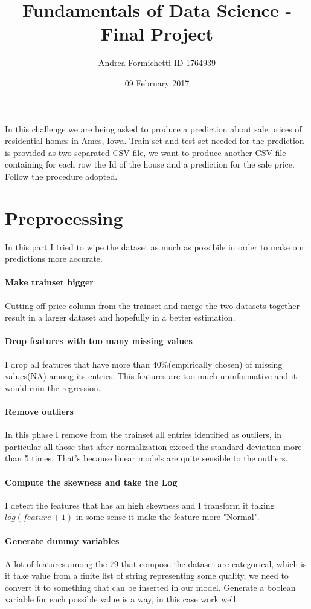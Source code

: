 \documentclass[a4paper, 11pt]{article}
\title{\vspace{-3cm}%
  Fundamentals of Data Science - Final Project \\
  \large }
\author{Andrea Formichetti ID-1764939}
\date{09 February 2017}
\begin{document}
\maketitle

In this challenge we are being asked to produce a prediction about sale prices of residential homes in Ames, Iowa. Train set and  test set needed for the prediction is provided as two separated CSV file, we want to produce another CSV file containing for each row the Id of the house and a prediction for the sale price. Follow the procedure adopted.

\section{Preprocessing}
In this part I tried to wipe the dataset as much as possibile in order to make our predictions more accurate.
\paragraph{Make trainset bigger}
Cutting off price column from the trainset and merge the two datasets together result in a larger dataset and hopefully in a better estimation.
\paragraph{Drop features with too many missing values}
I drop all features that have more than 40\%(empirically chosen) of missing values(NA) among its entries. This features are too much uninformative and it would ruin the regression.
\paragraph{Remove outliers} 
In this phase I remove from the trainset all entries identified as outliers, in particular all those that after normalization exceed the standard deviation more than 5 times. That's because linear models are quite sensible to the outliers. 
\paragraph{Compute the skewness and take the Log}
I detect the features that has an high skewness and I transform it taking $log(feature + 1)$ in some sense it make the feature more "Normal".
\paragraph{Generate dummy variables}
A lot of features among the 79 that compose the dataset are categorical, which is it take value from a finite list of string representing some quality, we need to convert it to something that can be inserted in our model. Generate a boolean variable for each possible value is a way, in this case work well.
\end{document}

